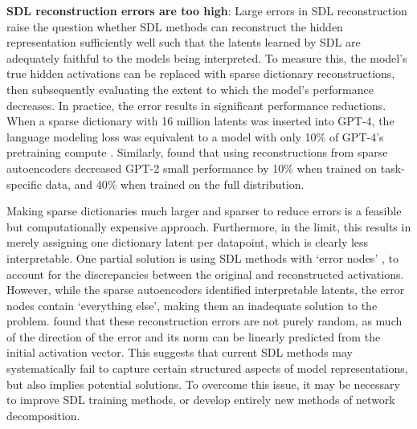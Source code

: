 \textbf{SDL reconstruction errors are too high}: Large errors in SDL reconstruction raise the question whether SDL methods can reconstruct the hidden representation sufficiently well such that the latents learned by SDL are adequately faithful to the models being interpreted. To measure this, the model's true hidden activations can be replaced with sparse dictionary reconstructions, then subsequently evaluating the extent to which the model's performance decreases. In practice, the error results in significant performance reductions. When a sparse dictionary with 16 million latents was inserted into GPT-4, the language modeling loss was equivalent to a model with only 10\% of GPT-4's pretraining compute \citep{gao2024scalingevaluatingsparseautoencoders}. Similarly, \citet{makelov2024principledevaluationssparseautoencoders} found that using reconstructions from sparse autoencoders decreased GPT-2 small performance by 10\% when trained on task-specific data, and 40\% when trained on the full distribution.

Making sparse dictionaries much larger and sparser to reduce errors is a feasible but computationally expensive approach. Furthermore, in the limit, this results in merely assigning one dictionary latent per datapoint, which is clearly less interpretable. One partial solution is using SDL methods with `error nodes' \citep{marks2024sparsefeaturecircuitsdiscovering}, to account for the discrepancies between the original and reconstructed activations. However, while the sparse autoencoders identified interpretable latents, the error nodes contain `everything else', making them an inadequate solution to the problem. \citet{engels2024decomposingdarkmattersparse} found that these reconstruction errors are not purely random, as much of the direction of the error and its norm can be linearly predicted from the initial activation vector. This suggests that current SDL methods may systematically fail to capture certain structured aspects of model representations, but also implies potential solutions. To overcome this issue, it may be necessary to improve SDL training methods, or develop entirely new methods of network decomposition.

